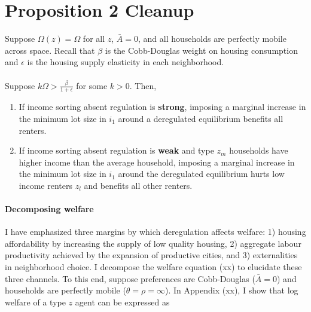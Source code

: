 \documentclass[11pt]{article}
\title{}
\author{}
\date{October 13, 2023}
\begin{document}
\maketitle

\section*{Proposition 2 Cleanup}

\begin{Proposition}\label{Prop:NeighborhoodChoiceExt}
		Suppose $\Omega(z) = \Omega$ for all $z$, $\bar{A} = 0$, and all households are perfectly mobile across space. Recall that $\beta$ is the Cobb-Douglas weight on housing consumption and $\epsilon$ is the housing supply elasticity in each neighborhood. 
		
		\paragraph*{}\noindent Suppose $k\Omega > \frac{\beta}{1 + \epsilon}$ for some $k > 0$. Then,
		
		\begin{enumerate}
			\item If income sorting absent regulation is \textbf{strong}, imposing a marginal increase in the minimum lot size in $i_{1}$ around a deregulated equilibrium benefits all renters. 
			
			\item If income sorting absent regulation is \textbf{weak} and type $z_{m}$ households have higher income than the average household, imposing a marginal increase in the minimum lot size in $i_{1}$ around the deregulated equilibrium hurts low income renters $z_{l}$ and benefits all other renters. 
		\end{enumerate}
	
\end{Proposition}

\paragraph*{}
\paragraph*{Decomposing welfare} I have emphasized three margins by which deregulation affects welfare: 1) housing affordability by increasing the supply of low quality housing, 2) aggregate labour productivity achieved by the expansion of productive cities, and 3) externalities in neighborhood choice. I decompose the welfare equation (xx) to elucidate these three channels. To this end, suppose preferences are Cobb-Douglas ($\bar{A} = 0$) and households are perfectly mobile ($\theta = \rho = \infty$). In Appendix (xx), I show that log welfare of a type $z$ agent can be expressed as 
\end{document}
